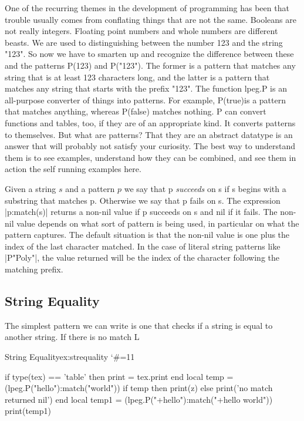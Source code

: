One of the recurring themes in the development of programming has been that trouble usually comes from conflating things that are not the same. Booleans are not really integers. Floating point numbers and whole numbers are different beasts. We are used to distinguishing between the number 123 and the string "123". So now we have to smarten up and recognize the difference between these and the patterns P(123) and P("123"). The former is a pattern that matches any string that is at least 123 characters long, and the latter is a pattern that matches any string that starts with the prefix "123". The function lpeg.P is an all-purpose converter of things into patterns. For example, P(true)is a pattern that matches anything, whereas P(false) matches nothing. P can convert functions and tables, too, if they are of an appropriate kind. It converts patterns to themselves. But what are patterns? That they are an abstract datatype is an answer that will probably not satisfy your curiosity. The best way to understand them is to see examples, understand how they can be combined, and see them in action the self running examples here.

Given a string $s$ and a pattern $p$ we say that p \textit{succeeds} on s if s begins with a substring that matches p. Otherwise we say that p fails on s. The expression |p:match(s)| returns a non-nil value if p succeeds on s and nil if it fails. The non-nil value depends on what sort of pattern is being used, in particular on what the pattern captures. The default situation is that the non-nil value is one plus the index of the last character matched. In the case of literal string patterns like |P"Poly"|, the value returned will be the index of the character following the matching prefix.


\subsection{String Equality}

The simplest pattern we can write is one that checks if a string is equal to another string. If there is no match L

\begin{texexample}{String Equality}{ex:strequality}
\bgroup
\catcode`\#=11
\begin{luacode}
if type(tex) == 'table' then print = tex.print end
local temp = (lpeg.P("hello"):match("world")) 
if temp then
   print(z)
   else print('no match returned nil') 
end   
local temp1 = (lpeg.P("+hello"):match("+hello world")) 
print(temp1)
\end{luacode}
\egroup
\end{texexample}


